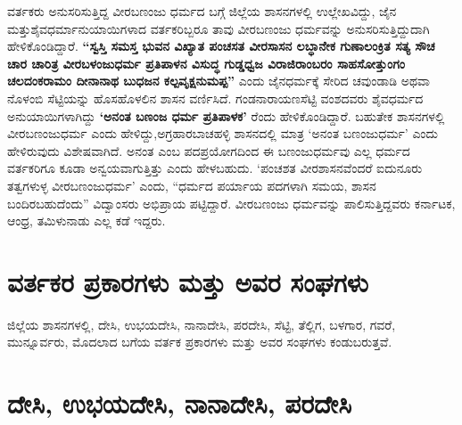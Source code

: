 ವರ್ತಕರು ಅನುಸರಿಸುತ್ತಿದ್ದ ವೀರಬಣಂಜು ಧರ್ಮದ ಬಗ್ಗೆ ಜಿಲ್ಲೆಯ ಶಾಸನಗಳಲ್ಲಿ ಉಲ್ಲೇಖವಿದ್ದು, ಜೈನ ಮತ್ತು\break ಶೈವಧರ್ಮಾನುಯಾಯಿಗಳಾದ ವರ್ತಕರಿಬ್ಬರೂ ತಾವು ವೀರಬಣಂಜು ಧರ್ಮವನ್ನು ಅನುಸರಿಸುತ್ತಿದ್ದುದಾಗಿ ಹೇಳಿಕೊಂಡಿದ್ದಾರೆ. \textbf{“ಸ್ವಸ್ತಿ ಸಮಸ್ತ ಭುವನ ವಿಖ್ಯಾತ ಪಂಚಸತ ವೀರಸಾಸನ ಲಬ್ಧಾನೇಕ ಗುಣಾಲಂಕ್ರಿತ ಸತ್ಯ ಸೌಚ ಚಾರ ಚಾರಿತ್ರ ವೀರಬಳಂಜುಧರ್ಮ ಪ್ರತಿಪಾಳನ ವಿಸುದ್ಧ ಗುಡ್ಡಧ್ವಜ ವಿರಾಜಿರಾಂಬರಂ ಸಾಹಸೋತ್ತುಂಗಂ ಚಲದಂಕರಾಮಂ ದೀನಾನಾಥ ಬುಧಜನ\general{\break } ಕಲ್ಪವೃಕ್ಷನುಮಪ್ಪ”} ಎಂದು ಜೈನಧರ್ಮಕ್ಕೆ ಸೇರಿದ ಚವುಂಡಾಡಿ ಅಥವಾ ನೊಳಂಬಿ ಸೆಟ್ಟಿಯನ್ನು ಹೊಸಹೊಳಲಿನ ಶಾಸನ ವರ್ಣಿಸಿದೆ. ಗಂಡನಾರಾಯಣಸೆಟ್ಟಿ ವಂಶದವರು ಶೈವಧರ್ಮದ ಅನುಯಾಯಿಗಳಾಗಿದ್ದು \textbf{‘ಅನಂತ ಬಣಂಜ ಧರ್ಮ ಪ್ರತಿಪಾಳಕ’} ರೆಂದು ಹೇಳಿಕೊಂಡಿದ್ದಾರೆ. ಬಹುತೇಕ ಶಾಸನಗಳಲ್ಲಿ ವೀರಬಣಂಜುಧರ್ಮ ಎಂದು ಹೇಳಿದ್ದು,\break ಅಗ್ರಹಾರಬಾಚಹಳ್ಳಿ ಶಾಸನದಲ್ಲಿ ಮಾತ್ರ ‘ಅನಂತ ಬಣಂಜುಧರ್ಮ’ ಎಂದು ಹೇಳಿರುವುದು ವಿಶೇಷವಾಗಿದೆ. ಅನಂತ ಎಂಬ ಪದಪ್ರಯೋಗದಿಂದ ಈ ಬಣಂಜುಧರ್ಮವು ಎಲ್ಲ ಧರ್ಮದ ವರ್ತಕರಿಗೂ ಕೂಡಾ ಅನ್ವಯವಾಗುತ್ತಿತ್ತು ಎಂದು ಹೇಳಬಹುದು. ‘ಪಂಚಶತ ವೀರಶಾಸನವೆಂದರೆ ಐದುನೂರು ತತ್ವಗಳುಳ್ಳ ವೀರಬಣಂಜುಧರ್ಮ’ ಎಂದು, “ಧರ್ಮದ ಪರ್ಯಾಯ ಪದಗಳಾಗಿ ಸಮಯ, ಶಾಸನ ಬಂದಿರಬಹುದೆಂದು” ವಿದ್ವಾಂಸರು ಅಭಿಪ್ರಾಯ ಪಟ್ಟಿದ್ದಾರೆ. ವೀರಬಣಂಜು ಧರ್ಮವನ್ನು ಪಾಲಿಸುತ್ತಿದ್ದವರು ಕರ್ನಾಟಕ, ಆಂಧ್ರ, ತಮಿಳುನಾಡು ಎಲ್ಲ ಕಡೆ ಇದ್ದರು.

\section*{ವರ್ತಕರ ಪ್ರಕಾರಗಳು ಮತ್ತು ಅವರ ಸಂಘಗಳು}

ಜಿಲ್ಲೆಯ ಶಾಸನಗಳಲ್ಲಿ, ದೇಸಿ, ಉಭಯದೇಸಿ, ನಾನಾದೇಸಿ, ಪರದೇಸಿ, ಸೆಟ್ಟಿ, ತೆಲ್ಲಿಗ, ಬಳಗಾರ, ಗವರೆ, ಮುನ್ನೂರ್ವರು, ಮೊದಲಾದ ಬಗೆಯ ವರ್ತಕ ಪ್ರಕಾರಗಳು ಮತ್ತು ಅವರ ಸಂಘಗಳು ಕಂಡುಬರುತ್ತವೆ.

\section*{ದೇಸಿ, ಉಭಯದೇಸಿ, ನಾನಾದೇಸಿ, ಪರದೇಸಿ}

